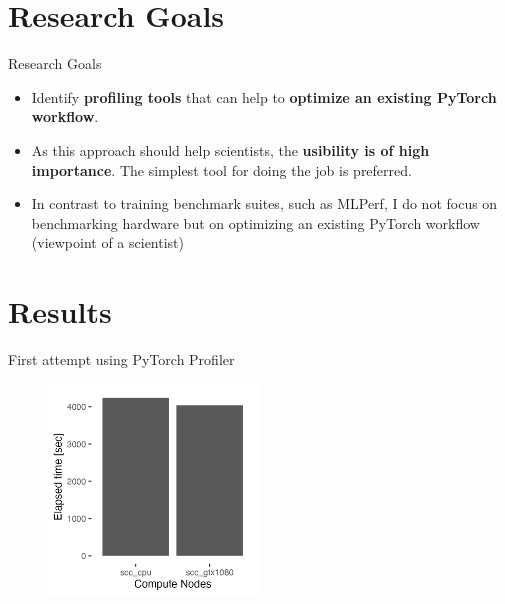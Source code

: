 \documentclass[compress,aspectratio=169]{beamer}
\begin{document}
\section{Research Goals}

\begin{frame}{Research Goals}

\begin{itemize}
    \item Identify \textbf{profiling tools} that can help to \textbf{optimize an existing PyTorch workflow}.
    \item As this approach should help scientists, the \textbf{usibility is of high importance}. The simplest tool for doing the job is preferred.
    \item In contrast to training benchmark suites, such as MLPerf, I do not focus on benchmarking hardware but on optimizing an existing PyTorch workflow (viewpoint of a scientist)
\end{itemize}

\end{frame}

\section{Results}

\begin{frame}{First attempt using PyTorch Profiler}
    \begin{center}
    \begin{figure}
        \includegraphics[width=0.5\textwidth]{../../data/sacct_barplot_by_nodes_profiler-torch_sample-points}
    \end{figure}
    \end{center}
\end{frame}
\end{document}
